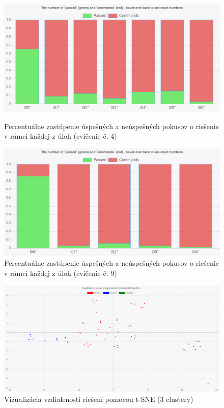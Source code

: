 \begin{figure}[h]
	\centerline{\includegraphics[width=1\textwidth]{images/histogram.png}}
	\caption[Percentuálne zastúpenie úspešných a neúspešných pokusov o riešenie]{Percentuálne zastúpenie úspešných a neúspešných pokusov o riešenie v rámci každej z úloh (cvičenie č. 4)}
	\label{img:histogram}
	
	\vspace{\baselineskip}
	\vspace{\baselineskip}
	
	\centerline{\includegraphics[width=1\textwidth]{images/histogram2.png}}
	\caption[Percentuálne zastúpenie úspešných a neúspešných pokusov o riešenie]{Percentuálne zastúpenie úspešných a neúspešných pokusov o riešenie v rámci každej z úloh (cvičenie č. 9)}
	\label{img:histogram2}
\end{figure}

\begin{figure}
	\centerline{\includegraphics[width=1\textwidth]{images/tsnevizualizacia.png}}
	\caption[Vizualizácia vzdialeností riešení pomocou t-SNE]{Vizualizácia vzdialeností riešení pomocou t-SNE (3 clustery)}
	\label{img:tsne}
\end{figure}


